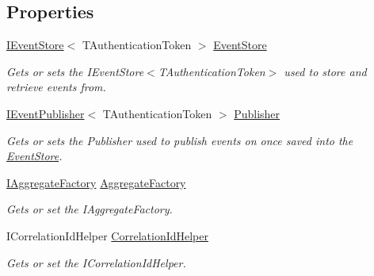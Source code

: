 \subsection*{Properties}
\begin{DoxyCompactItemize}
\item 
\hyperlink{interfaceCqrs_1_1Events_1_1IEventStore}{I\+Event\+Store}$<$ T\+Authentication\+Token $>$ \hyperlink{classCqrs_1_1Domain_1_1AggregateRepository_a99c8546ada9058c0488727b01c626528_a99c8546ada9058c0488727b01c626528}{Event\+Store}
\begin{DoxyCompactList}\small\item\em Gets or sets the I\+Event\+Store$<$\+T\+Authentication\+Token$>$ used to store and retrieve events from. \end{DoxyCompactList}\item 
\hyperlink{interfaceCqrs_1_1Events_1_1IEventPublisher}{I\+Event\+Publisher}$<$ T\+Authentication\+Token $>$ \hyperlink{classCqrs_1_1Domain_1_1AggregateRepository_a6388abb96d4480c6141f5d5e469a2ca0_a6388abb96d4480c6141f5d5e469a2ca0}{Publisher}
\begin{DoxyCompactList}\small\item\em Gets or sets the Publisher used to publish events on once saved into the \hyperlink{namespaceCqrs_1_1EventStore}{Event\+Store}. \end{DoxyCompactList}\item 
\hyperlink{interfaceCqrs_1_1Domain_1_1Factories_1_1IAggregateFactory}{I\+Aggregate\+Factory} \hyperlink{classCqrs_1_1Domain_1_1AggregateRepository_a9c2ffdf87ba242cf0c540f4b0d020777_a9c2ffdf87ba242cf0c540f4b0d020777}{Aggregate\+Factory}
\begin{DoxyCompactList}\small\item\em Gets or set the I\+Aggregate\+Factory. \end{DoxyCompactList}\item 
I\+Correlation\+Id\+Helper \hyperlink{classCqrs_1_1Domain_1_1AggregateRepository_a758d2fd5c0cf30bc038a996800421fd0_a758d2fd5c0cf30bc038a996800421fd0}{Correlation\+Id\+Helper}
\begin{DoxyCompactList}\small\item\em Gets or set the I\+Correlation\+Id\+Helper. \end{DoxyCompactList}\end{DoxyCompactItemize}


